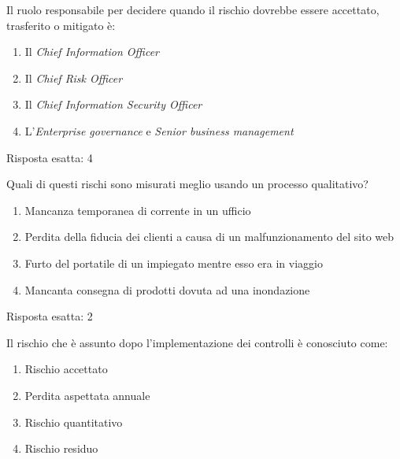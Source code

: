 
\begin{Exercise} [
  title={Quiz},
  label={gestRisk5}
  ]

  \Question Il ruolo responsabile per decidere quando il rischio dovrebbe
essere accettato, trasferito o mitigato \`e:
\begin{enumerate}
 \item Il \textit{Chief Information Officer}
 \item Il \textit{Chief Risk Officer}
 \item Il \textit{Chief Information Security Officer}
 \item L'\textit{Enterprise governance} e \textit{Senior business management}
\end{enumerate}

\end{Exercise}


\begin{Answer} [
  ref={gestRisk5},
  number={5}
  ]

  \Question Risposta esatta: 4

\end{Answer}



\begin{Exercise} [
  title={Quiz},
  label={gestRisk6}
  ]

  \Question Quali di questi rischi sono misurati meglio usando un processo
qualitativo?
\begin{enumerate}
 \item Mancanza temporanea di corrente in un ufficio
 \item Perdita della fiducia dei clienti a causa di un malfunzionamento del
sito web
 \item Furto del portatile di un impiegato mentre esso era in viaggio
 \item Mancanta consegna di prodotti dovuta ad una inondazione
\end{enumerate}

\end{Exercise}


\begin{Answer} [
  ref={gestRisk6},
  number={6}
  ]

  \Question Risposta esatta: 2

\end{Answer}



\begin{Exercise} [
  title={Quiz},
  label={gestRisk7}
  ]

  \Question Il rischio che \`e assunto dopo l'implementazione dei controlli \`e
conosciuto come:
\begin{enumerate}
 \item Rischio accettato
 \item Perdita aspettata annuale
 \item Rischio quantitativo
 \item Rischio residuo
\end{enumerate}

\end{Exercise}



